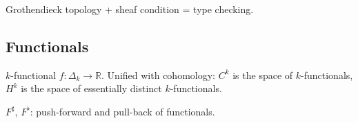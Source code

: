 \begin{definition}
Grothendieck topology + sheaf condition = type checking.
\end{definition}

\subsection{Functionals}

\begin{definition}
$k$-functional $f : \Delta_k \to \mathbb{R}$. Unified with cohomology: $C^k$ is the space of $k$-functionals, $H^k$ is the space of essentially distinct $k$-functionals.
\end{definition}

\begin{definition}
$F^\sharp$, $F^\flat$: push-forward and pull-back of functionals.
\end{definition}
